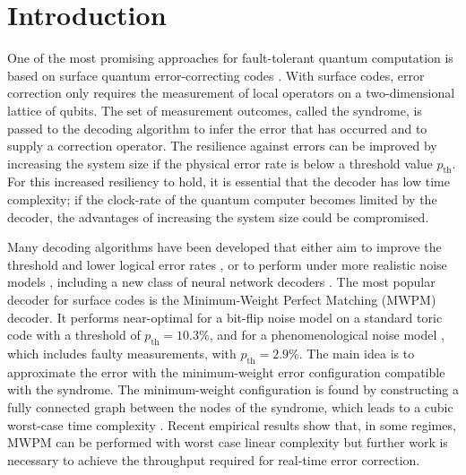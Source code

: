 \section{Introduction}\label{sec:introduction}
One of the most promising approaches for fault-tolerant quantum computation is based on surface quantum error-correcting codes \cite{dennis2002topological, kitaev2003fault}. With surface codes, error correction only requires the measurement of local operators on a two-dimensional lattice of qubits. The set of measurement outcomes, called the syndrome, is passed to the decoding algorithm to infer the error that has occurred and to supply a correction operator. The resilience against errors can be improved by increasing the system size if the physical error rate is below a threshold value $p_{\text{th}}$. For this increased resiliency to hold, it is essential that the decoder has low time complexity; if the clock-rate of the quantum computer becomes limited by the decoder, the advantages of increasing the system size could be compromised.

Many decoding algorithms have been developed that either aim to improve the threshold and lower logical error rates \cite{wang2003confinement, raussendorf2007faulttolerant, fowler2012towards, fowler2013minimum, heim2016optimal, duclos2010fast, duclos2013fault, bravyi2014efficient, darmawan2018linear}, or to perform under more realistic noise models \cite{tuckett2020fault, hutter2015improved, bravyi2013quantum,  nickerson2019analysing, wootton2012high, huang2020fault}, including a new class of neural network decoders \cite{baireuther2019neural, chamberland2018deep, liu2019neural, nautrup2019optimizing, torlai2017neural, varsamopoulos2017decoding, varsamopoulos2020decoding}. %
The most popular decoder for surface codes is the Minimum-Weight Perfect Matching (MWPM) decoder. It performs near-optimal for a bit-flip noise model \cite{dennis2002topological} on a standard toric code with a threshold of $p_{\text{th}} = 10.3\%$, and for a phenomenological noise model \cite{wang2003confinement}, which includes faulty measurements, with $p_{\text{th}} = 2.9\%$. The main idea is to approximate the error with the minimum-weight error configuration compatible with the syndrome. The minimum-weight configuration is found by constructing a fully connected graph between the nodes of the syndrome, which leads to a cubic worst-case time complexity \cite{kolmogorov2009blossom}. Recent empirical results show that, in some regimes, MWPM can be performed with worst case linear complexity \cite{fowler2012towards} but further work is necessary to achieve the throughput required for real-time error correction.

